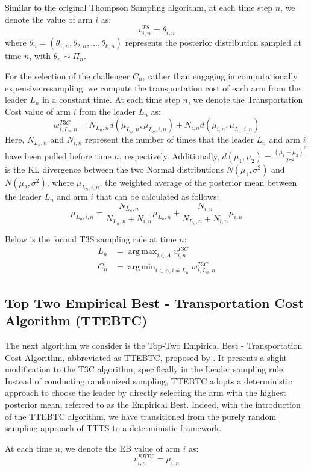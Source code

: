 \documentclass[a4paper, 12pt]{article}
\DeclareMathOperator{\argmax}{arg\,max}
\DeclareMathOperator{\argmin}{arg\,min}
\theoremstyle{definition}
\begin{document}
Similar to the original Thompson Sampling algorithm, at each time step $n$, we denote the value of arm $i$ as:
\[
v_{i,n}^{TS} = \theta_{i,n}   
\]
where $\theta_n = (\theta_{1,n},\theta_{2,n}, ..., \theta_{k,n})$ represents the posterior distribution sampled at time $n$, with $\theta_{n}\sim \Pi_n$.

For the selection of the challenger $C_n$, rather than engaging in computationally expensive resampling, we compute the transportation cost of each arm from the leader $L_n$ in a constant time. At each time step $n$, we denote the Transportation Cost value of arm $i$ from the leader $L_n$ as:
\[
w_{i,L_n,n}^{T3C} = N_{L_n,n} d(\mu_{L_n,n},\mu_{L_n,i,n})+ N_{i,n} d(\mu_{i,n},\mu_{L_n,i,n})     
\]
Here, $N_{L_n,n}$ and $N_{i,n}$ represent the number of times that the leader $L_n$ and arm $i$ have been pulled before time $n$, respectively. Additionally, $d(\mu_1,\mu_2) = \frac{(\mu_1 - \mu_2)^2}{2\sigma^2}$ is the KL divergence between the two Normal distributions $N(\mu_1,\sigma^2)$ and $N(\mu_2,\sigma^2)$, where $\mu_{L_n,i,n}$, the weighted average of the posterior mean between the leader $L_n$ and arm $i$ that can be calculated as follows:
\[
\mu_{L_n,i,n} = \frac{N_{L_n,n}}{N_{L_n,n}+N_{i,n}} \mu_{L_n,n} + \frac{N_{i,n}}{N_{L_n,n}+N_{i,n}} \mu_{i,n}  
\]

Below is the formal T3S sampling rule at time $n$:
\begin{align} \label{eq:t3c}
L_n & = \argmax_{i\in A} v_{i,n}^{T3C} \nonumber \\
C_n & = \argmin_{i\in A,i\neq L_n} w_{i,L_n,n}^{T3C}
\end{align}


\subsection{Top Two Empirical Best - Transportation Cost Algorithm (TTEBTC)}
The next algorithm we consider is the Top-Two Empirical Best - Transportation Cost Algorithm, abbreviated as TTEBTC, proposed by \cite{ttebtc}. It presents a slight modification to the T3C algorithm, specifically in the Leader sampling rule. Instead of conducting randomized sampling, TTEBTC adopts a deterministic approach to choose the leader by directly selecting the arm with the highest posterior mean, referred to as the Empirical Best. Indeed, with the introduction of the TTEBTC algorithm, we have transitioned from the purely random sampling approach of TTTS to a deterministic framework.

At each time $n$, we denote the EB value of arm $i$ as:
\[
v_{i,n}^{EBTC} = \mu_{i,n}   
\]
\end{document}
